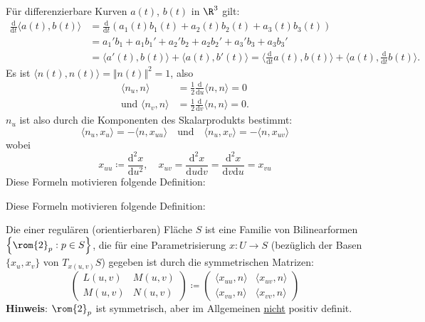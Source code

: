 \begin{remark}[Zwischenbemerkung]
  Für differenzierbare Kurven \( a(t) \), \( b(t) \) in \( \R^3 \) gilt:
  \begin{align*}
    \frac{\text{d}}{\text{d}t}\langle a(t), b(t) \rangle &= \frac{\text{d}}{\text{d}t}\left( a_1(t)b_1(t)+a_2(t)b_2(t)+a_3(t)b_3(t) \right) \\
     &= a_1'b_1+a_1b_1'+a_2'b_2+a_2b_2' + a_3'b_3+a_3b_3' \\
     &= \langle a'(t),b(t) \rangle + \langle a(t),b'(t) \rangle = \langle \frac{\text{d}}{\text{d} t}a(t),b(t) \rangle + \langle a(t), \frac{\text{d}}{\text{d}t}b(t) \rangle\text{.}
  \end{align*}
  Es ist \( \langle n(t),n(t) \rangle = \Vert n(t) \Vert^2 = 1 \), also
  \begin{align*}
    \langle n_u,n \rangle &= \frac{1}{2}\frac{\text{d}}{\text{d}u}\langle n,n \rangle = 0 \\
    \text{und } \langle n_v,n \rangle &= \frac{1}{2}\frac{\text{d}}{\text{d}v}\langle n,n \rangle = 0\text{.}
  \end{align*}
  \( n_u \) ist also durch die Komponenten des Skalarprodukts bestimmt:
  \begin{equation*}
    \langle n_u,x_u \rangle = -\langle n,x_{uu} \rangle \quad \text{und} \quad \langle n_u,x_v \rangle = - \langle n,x_{uv} \rangle
  \end{equation*}
  wobei
  \begin{equation*}
    x_{uu} \coloneqq \frac{\text{d}^2x}{\text{d}u^2}, \quad x_{uv}= \frac{\text{d}^2x}{\text{d}u\text{d}v} = \frac{\text{d}^2x}{\text{d}v\text{d}u} = x_{vu}
  \end{equation*}
  Diese Formeln motivieren folgende Definition:
\end{remark}

Diese Formeln motivieren folgende Definition:

\begin{definition}[2. Fundamentalform]
  Die \label{def:zweiteFundamentalform} einer regulären (orientierbaren) Fläche \( S \) ist eine Familie von Bilinearformen \( \left \{ \rom{2}_p : p \in S \right \} \), die für eine Parametrisierung \( x: U \to S \) (bezüglich der Basen \( \{ x_u, x_v \} \) von \( T_{x(u,v)}S \)) gegeben ist durch die symmetrischen Matrizen:
  \begin{equation*}
    \begin{pmatrix}
      L(u,v) & M(u,v) \\
      M(u,v) & N(u,v)
    \end{pmatrix} \coloneqq \begin{pmatrix}
      \langle x_{uu},n \rangle & \langle x_{uv},n \rangle \\
      \langle x_{vu},n \rangle & \langle x_{vv},n \rangle
    \end{pmatrix}
  \end{equation*}
  \textbf{Hinweis}: \( \rom{2}_p \) ist symmetrisch, aber im Allgemeinen \underline{nicht} positiv definit.
\end{definition}

